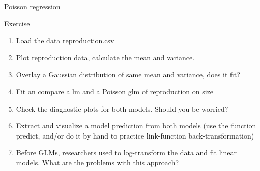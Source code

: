 \documentclass[10pt]{beamer}\usepackage[]{graphicx}\usepackage[]{color}
\begin{document}
\begin{frame}[fragile]{Poisson regression}


  
  
  \begin{exampleblock}{Exercise}
    \begin{enumerate}
      \item Load the data reproduction.csv
      \item Plot reproduction data, calculate the mean and variance. 
      \item Overlay a Gaussian distribution of same mean and variance, does it fit?
      \item Fit an compare a lm and a Poisson glm of reproduction on size 
      \item Check the diagnostic plots for both models. Should you be worried?
      \item Extract and visualize a model prediction from both models (use the function predict, and/or do it by hand to practice link-function back-transformation)
      \item Before GLMs, researchers used to log-transform the data and fit linear models. What are the problems with this approach?
    \end{enumerate}
  \end{exampleblock}
  


\end{frame}
\end{document}
